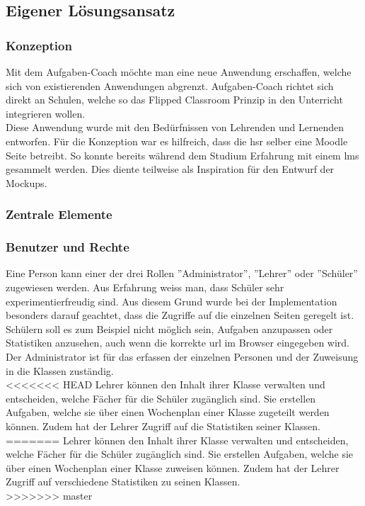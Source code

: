 \subsection{Eigener Lösungsansatz}
\subsubsection{Konzeption}
Mit dem Aufgaben-Coach möchte man eine neue Anwendung erschaffen, welche sich von existierenden Anwendungen abgrenzt. Aufgaben-Coach richtet sich direkt an Schulen, welche so das Flipped Classroom Prinzip in den Unterricht integrieren wollen. \\

Diese Anwendung wurde mit den Bedürfnissen von Lehrenden und Lernenden entworfen. Für die Konzeption war es hilfreich, dass die \gls{hsr} selber eine Moodle Seite betreibt. So konnte bereits während dem Studium Erfahrung mit einem \gls{lms} gesammelt werden. Dies diente teilweise als Inspiration für den Entwurf der Mockups.

\subsubsection{Zentrale Elemente}
\subsubsection*{Benutzer und Rechte}
Eine Person kann einer der drei Rollen ''Administrator'', ''Lehrer'' oder ''Schüler'' zugewiesen werden. Aus Erfahrung weiss man, dass Schüler sehr experimentierfreudig sind. Aus diesem Grund wurde bei der Implementation besonders darauf geachtet, dass die Zugriffe auf die einzelnen Seiten geregelt ist. Schülern soll es zum Beispiel nicht möglich sein, Aufgaben anzupassen oder Statistiken anzusehen, auch wenn die korrekte \gls{url} im Browser eingegeben wird. \\

Der Administrator ist für das erfassen der einzelnen Personen und der Zuweisung in die Klassen zuständig. \\

<<<<<<< HEAD
Lehrer können den Inhalt ihrer Klasse verwalten und entscheiden, welche Fächer für die Schüler zugänglich sind. Sie erstellen Aufgaben, welche sie über einen Wochenplan einer Klasse zugeteilt werden können. Zudem hat der Lehrer Zugriff auf die Statistiken seiner Klassen. \\
=======
Lehrer können den Inhalt ihrer Klasse verwalten und entscheiden, welche Fächer für die Schüler zugänglich sind. Sie erstellen Aufgaben, welche sie über einen Wochenplan einer Klasse zuweisen können. Zudem hat der Lehrer Zugriff auf verschiedene Statistiken zu seinen Klassen. \\
>>>>>>> master

